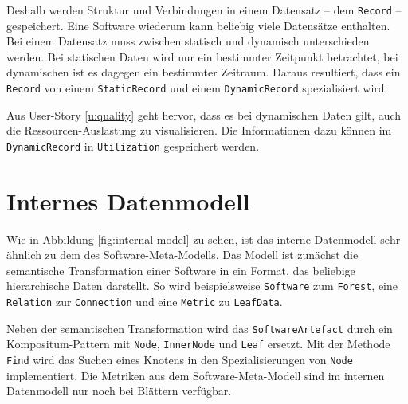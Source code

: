 Deshalb werden Struktur und Verbindungen in einem Datensatz -- dem \texttt{Record} -- gespeichert. Eine Software wiederum kann beliebig viele Datensätze enthalten. Bei einem Datensatz muss zwischen statisch und dynamisch unterschieden werden. Bei statischen Daten wird nur ein bestimmter Zeitpunkt betrachtet, bei dynamischen ist es dagegen ein bestimmter Zeitraum. Daraus resultiert, dass ein \texttt{Record} von einem \texttt{StaticRecord} und einem \texttt{DynamicRecord} spezialisiert wird.

Aus User-Story \ref{u:quality} geht hervor, dass es bei dynamischen Daten gilt, auch die Ressourcen-Auslastung zu visualisieren. Die Informationen dazu können im \texttt{DynamicRecord} in \texttt{Utilization} gespeichert werden.

\section{Internes Datenmodell}
\label{sec:app-model}

Wie in Abbildung \ref{fig:internal-model} zu sehen, ist das interne Datenmodell sehr ähnlich zu dem des Software-Meta-Modells. Das Modell ist zunächst die semantische Transformation einer Software in ein Format, das beliebige hierarchische Daten darstellt. So wird beispielsweise \texttt{Software} zum \texttt{Forest}, eine \texttt{Relation} zur \texttt{Connection} und eine \texttt{Metric} zu \texttt{LeafData}.

Neben der semantischen Transformation wird das \texttt{SoftwareArtefact} durch ein Kompositum-Pattern mit \texttt{Node}, \texttt{InnerNode} und \texttt{Leaf} ersetzt. Mit der Methode \texttt{Find} wird das Suchen eines Knotens in den Spezialisierungen von \texttt{Node} implementiert. Die Metriken aus dem Software-Meta-Modell sind im internen Datenmodell nur noch bei Blättern verfügbar.

